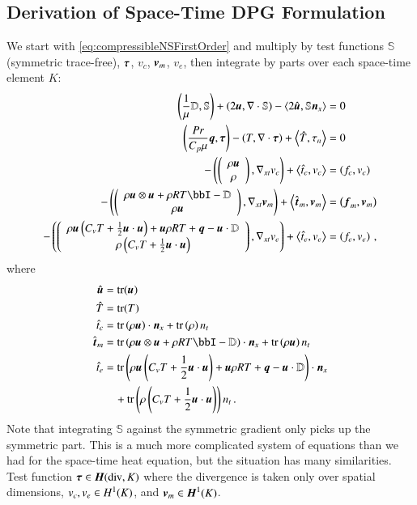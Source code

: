 \documentclass[preprint,12pt]{elsarticle}
\begin{document}
\subsection{Derivation of Space-Time DPG Formulation}
We start with \eqref{eq:compressibleNSFirstOrder} and multiply by test functions $\mathbb{S}$ (symmetric trace-free), $\boldsymbol\tau$,
$v_c$, $\boldsymbol v_m$, $v_e$, then integrate by parts over each space-time element $K$:
\begin{subequations}
\label{eq:compressibleNSBF}
\begin{align}
	\LRp{\frac{1}{\mu}\mathbb{D},\mathbb{S}}+\LRp{2\bfu,\Div\mathbb{S}}
	-\LRa{2\hat\bfu,\mathbb{S}\bfn_x}&=0\\
	\LRp{\frac{Pr}{C_p\mu}\bfq,\bftau}-\LRp{T,\Div\bftau}+\LRa{\hat T,\tau_n}&=0\\
	-\LRp{\vecttwo{\rho\bfu}{\rho},\Gradxt v_c}+\LRa{\hat t_c,v_c}&=\LRp{f_c,v_c}\\
	-\LRp{\vecttwo{\rho\bfu\otimes\bfu+\rho RT\bbI-\mathbb{D}}{\rho\bfu},\Gradxt\bfv_m}+\LRa{\hat\bft_m,\bfv_m}&=\LRp{\bff_m,\bfv_m}\\
	-\LRp{\vecttwo{\rho\bfu\LRp{C_v T+\frac{1}{2}\bfu\cdot\bfu}+\bfu\rho RT+\bfq-\bfu\cdot\mathbb{D}}{\rho\LRp{C_v T+\frac{1}{2}\bfu\cdot\bfu}},\Gradxt v_e}
	+\LRa{\hat t_e,v_e}&=\LRp{f_e,v_e}\,,
\end{align}
\end{subequations}
where 
\begin{equation*}
\begin{aligned}
\hat\bfu&=\trace(\bfu)\\
\hat T&=\trace(T)\\
\hat t_c&=\trace\LRp{\rho\bfu}\cdot\bfn_x
+\trace\LRp{\rho}n_t\\
\hat\bft_m&=\trace\LRp{\rho\bfu\otimes\bfu+\rho RT\bbI-\mathbb{D}}\cdot\bfn_x
+\trace\LRp{\rho\bfu} n_t\\
\hat t_e&=\trace\LRp{\rho\bfu\LRp{C_v T+\frac{1}{2}\bfu\cdot\bfu}+\bfu\rho RT+\bfq-\bfu\cdot\mathbb{D}}\cdot\bfn_x\\
&\quad+\trace\LRp{\rho\LRp{C_v T+\frac{1}{2}\bfu\cdot\bfu}}n_t\,.
\end{aligned}
\end{equation*}
Note that integrating $\mathbb{S}$ against the symmetric gradient only picks up the symmetric part.
This is a much more complicated system of equations than we had for the space-time heat equation, but the situation has many similarities.
Test function $\boldsymbol\tau\in\mbox{\boldmath $H$}(\text{div},K)$ where the divergence is taken only over spatial dimensions, $v_c,v_e\in H^{1}(K)$, and $\boldsymbol v_m\in\mbox{\boldmath $H$}^{1}(K)$.
\end{document}

